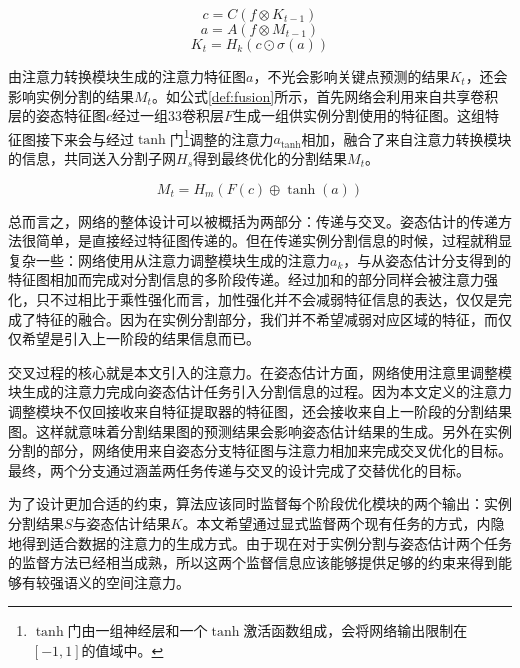 \begin{equation}
\label{def:sharedconv}
c = C(f\otimes{K_{t-1}})
\end{equation}
\begin{equation}
\label{def:attenconverter}
a = A(f\otimes{M_{t-1}})
\end{equation}
\begin{equation}
\label{def:keypointhead}
K_t = H_k(c\odot \sigma(a))
\end{equation}

由注意力转换模块生成的注意力特征图$a$，不光会影响关键点预测的结果$K_t$，还会影响实例分割的结果$M_t$。如公式\eqref{def:fusion}所示，首先网络会利用来自共享卷积层的姿态特征图$c$经过一组3\times3卷积层$F$生成一组供实例分割使用的特征图。这组特征图接下来会与经过$\tanh$门\footnote{$\tanh$门由一组神经层和一个$\tanh$激活函数组成，会将网络输出限制在$[-1, 1]$的值域中。}调整的注意力$a_{\tanh}$相加，融合了来自注意力转换模块的信息，共同送入分割子网$H_s$得到最终优化的分割结果$M_t$。

\begin{equation}
\label{def:fusion}
M_t = H_m(F(c) \oplus \tanh(a))
\end{equation}

总而言之，网络的整体设计可以被概括为两部分：传递与交叉。姿态估计的传递方法很简单，是直接经过特征图传递的。但在传递实例分割信息的时候，过程就稍显复杂一些：网络使用从注意力调整模块生成的注意力$a_k$，与从姿态估计分支得到的特征图相加而完成对分割信息的多阶段传递。经过加和的部分同样会被注意力强化，只不过相比于乘性强化而言，加性强化并不会减弱特征信息的表达，仅仅是完成了特征的融合。因为在实例分割部分，我们并不希望减弱对应区域的特征，而仅仅希望是引入上一阶段的结果信息而已。

交叉过程的核心就是本文引入的注意力。在姿态估计方面，网络使用注意里调整模块生成的注意力完成向姿态估计任务引入分割信息的过程。因为本文定义的注意力调整模块不仅回接收来自特征提取器的特征图，还会接收来自上一阶段的分割结果图。这样就意味着分割结果图的预测结果会影响姿态估计结果的生成。另外在实例分割的部分，网络使用来自姿态分支特征图与注意力相加来完成交叉优化的目标。最终，两个分支通过涵盖两任务传递与交叉的设计完成了交替优化的目标。

为了设计更加合适的约束，算法应该同时监督每个阶段优化模块的两个输出：实例分割结果$S$与姿态估计结果$K$。本文希望通过显式监督两个现有任务的方式，内隐地得到适合数据的注意力的生成方式。由于现在对于实例分割与姿态估计两个任务的监督方法已经相当成熟，所以这两个监督信息应该能够提供足够的约束来得到能够有较强语义的空间注意力。

